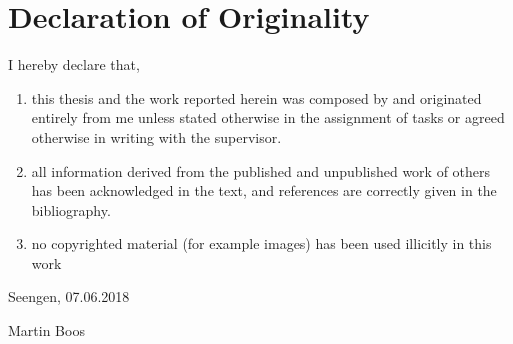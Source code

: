 \cleardoublepage
\markleft{\abstractname}

\chapter*{Declaration of Originality}
I hereby declare that,

\begin{enumerate}
    \item this thesis and the work reported herein was composed by and originated entirely from me unless stated otherwise in the assignment of tasks or agreed otherwise in writing with the supervisor.
    \item all information derived from the published and unpublished work of others has been acknowledged in the text, and references are correctly given in the bibliography.
    \item no copyrighted material (for example images) has been used illicitly in this work
\end{enumerate}

\begin{flushright}
Seengen, 07.06.2018

Martin Boos
\end{flushright}